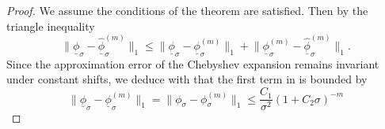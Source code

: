 \begin{proof}
    We assume the conditions of the theorem are satisfied. Then by the triangle inequality
    \begin{equation}
        \lVert \underline{\phi}_{\sigma} - \widehat{\underline{\phi}}_{\sigma}^{(m)}  \rVert _1
        \leq \lVert \underline{\phi}_{\sigma} - \underline{\phi}_{\sigma}^{(m)} \rVert _1
        + \lVert \underline{\phi}_{\sigma}^{(m)} - \widehat{\underline{\phi}}_{\sigma}^{(m)} \rVert _1.
        \label{equ:3-nystrom-nystrom-chebyshev-proof-triangle}
    \end{equation}
    Since the approximation error of the Chebyshev expansion remains invariant
    under constant shifts, we deduce with  that the
    first term in  is bounded by
    \begin{equation}
        \lVert \underline{\phi}_{\sigma} - \underline{\phi}_{\sigma}^{(m)} \rVert _1
        = \lVert \phi_{\sigma} - \phi_{\sigma}^{(m)} \rVert _1
        \leq \frac{C_1}{\sigma^2} (1 + C_2 \sigma)^{-m}
    \end{equation}

\end{proof}
